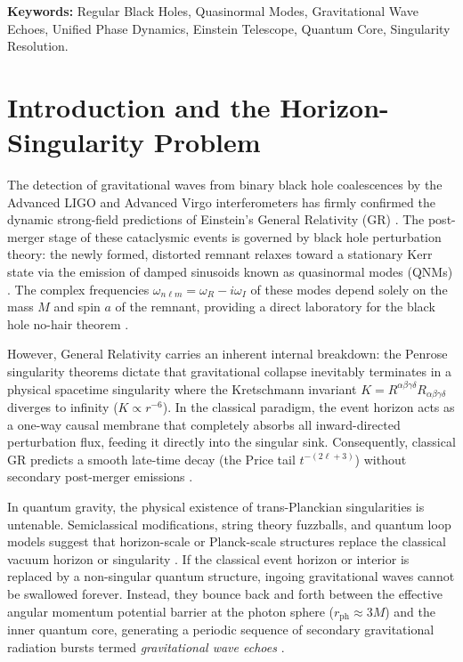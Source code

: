 \documentclass[11pt,a4paper]{article}
\begin{document}
\noindent\textbf{Keywords:} Regular Black Holes, Quasinormal Modes, Gravitational Wave Echoes, Unified Phase Dynamics, Einstein Telescope, Quantum Core, Singularity Resolution.

\section{Introduction and the Horizon-Singularity Problem}

The detection of gravitational waves from binary black hole coalescences by the Advanced LIGO and Advanced Virgo interferometers has firmly confirmed the dynamic strong-field predictions of Einstein's General Relativity (GR) \cite{Abbott2016,Abbott2019}. The post-merger stage of these cataclysmic events is governed by black hole perturbation theory: the newly formed, distorted remnant relaxes toward a stationary Kerr state via the emission of damped sinusoids known as quasinormal modes (QNMs) \cite{Regge1957,Zerilli1970,Teukolsky1973}. The complex frequencies $\omega_{n\ell m} = \omega_R - i \omega_I$ of these modes depend solely on the mass $M$ and spin $a$ of the remnant, providing a direct laboratory for the black hole no-hair theorem \cite{Berti2009}.

However, General Relativity carries an inherent internal breakdown: the Penrose singularity theorems \cite{Penrose1965} dictate that gravitational collapse inevitably terminates in a physical spacetime singularity where the Kretschmann invariant $K = R^{\alpha\beta\gamma\delta} R_{\alpha\beta\gamma\delta}$ diverges to infinity ($K \propto r^{-6}$). In the classical paradigm, the event horizon acts as a one-way causal membrane that completely absorbs all inward-directed perturbation flux, feeding it directly into the singular sink. Consequently, classical GR predicts a smooth late-time decay (the Price tail $t^{-(2\ell+3)}$) without secondary post-merger emissions \cite{Price1972}.

In quantum gravity, the physical existence of trans-Planckian singularities is untenable. Semiclassical modifications, string theory fuzzballs, and quantum loop models suggest that horizon-scale or Planck-scale structures replace the classical vacuum horizon or singularity \cite{Cardoso2017,Abedi2017}. If the classical event horizon or interior is replaced by a non-singular quantum structure, ingoing gravitational waves cannot be swallowed forever. Instead, they bounce back and forth between the effective angular momentum potential barrier at the photon sphere ($r_{\mathrm{ph}} \approx 3M$) and the inner quantum core, generating a periodic sequence of secondary gravitational radiation bursts termed \textit{gravitational wave echoes} \cite{Cardoso2016,Cardoso2017b}.
\end{document}
